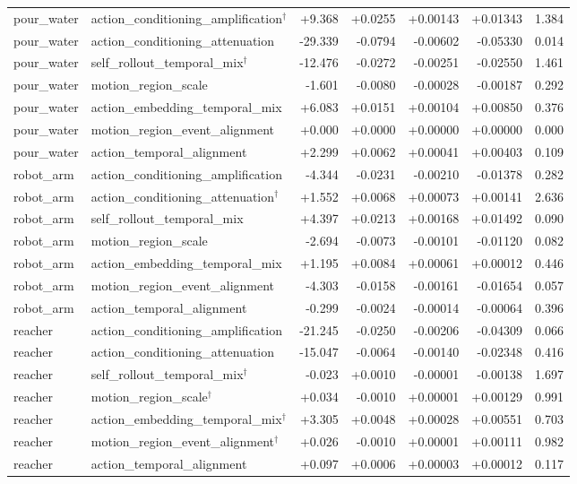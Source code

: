 \begin{table}[t]
\begin{tabular}{llrrrrr}
pour\_water & action\_conditioning\_amplification$^\dagger$ & +9.368 & +0.0255 & +0.00143 & +0.01343 & 1.384 \\
pour\_water & action\_conditioning\_attenuation & -29.339 & -0.0794 & -0.00602 & -0.05330 & 0.014 \\
pour\_water & self\_rollout\_temporal\_mix$^\dagger$ & -12.476 & -0.0272 & -0.00251 & -0.02550 & 1.461 \\
pour\_water & motion\_region\_scale & -1.601 & -0.0080 & -0.00028 & -0.00187 & 0.292 \\
pour\_water & action\_embedding\_temporal\_mix & +6.083 & +0.0151 & +0.00104 & +0.00850 & 0.376 \\
pour\_water & motion\_region\_event\_alignment & +0.000 & +0.0000 & +0.00000 & +0.00000 & 0.000 \\
pour\_water & action\_temporal\_alignment & +2.299 & +0.0062 & +0.00041 & +0.00403 & 0.109 \\
robot\_arm & action\_conditioning\_amplification & -4.344 & -0.0231 & -0.00210 & -0.01378 & 0.282 \\
robot\_arm & action\_conditioning\_attenuation$^\dagger$ & +1.552 & +0.0068 & +0.00073 & +0.00141 & 2.636 \\
robot\_arm & self\_rollout\_temporal\_mix & +4.397 & +0.0213 & +0.00168 & +0.01492 & 0.090 \\
robot\_arm & motion\_region\_scale & -2.694 & -0.0073 & -0.00101 & -0.01120 & 0.082 \\
robot\_arm & action\_embedding\_temporal\_mix & +1.195 & +0.0084 & +0.00061 & +0.00012 & 0.446 \\
robot\_arm & motion\_region\_event\_alignment & -4.303 & -0.0158 & -0.00161 & -0.01654 & 0.057 \\
robot\_arm & action\_temporal\_alignment & -0.299 & -0.0024 & -0.00014 & -0.00064 & 0.396 \\
reacher & action\_conditioning\_amplification & -21.245 & -0.0250 & -0.00206 & -0.04309 & 0.066 \\
reacher & action\_conditioning\_attenuation & -15.047 & -0.0064 & -0.00140 & -0.02348 & 0.416 \\
reacher & self\_rollout\_temporal\_mix$^\dagger$ & -0.023 & +0.0010 & -0.00001 & -0.00138 & 1.697 \\
reacher & motion\_region\_scale$^\dagger$ & +0.034 & -0.0010 & +0.00001 & +0.00129 & 0.991 \\
reacher & action\_embedding\_temporal\_mix$^\dagger$ & +3.305 & +0.0048 & +0.00028 & +0.00551 & 0.703 \\
reacher & motion\_region\_event\_alignment$^\dagger$ & +0.026 & -0.0010 & +0.00001 & +0.00111 & 0.982 \\
reacher & action\_temporal\_alignment & +0.097 & +0.0006 & +0.00003 & +0.00012 & 0.117 \\
\bottomrule
\end{tabular}
\end{table}

